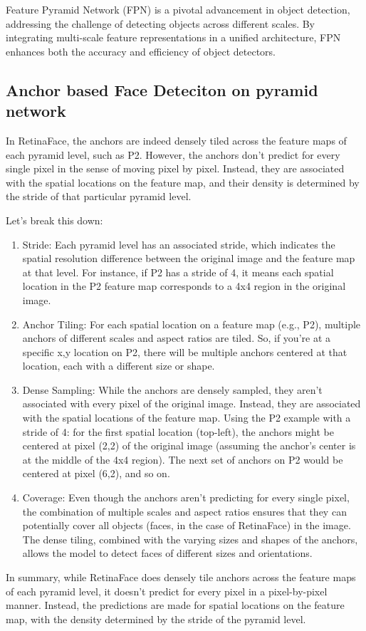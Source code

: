 \documentclass{article}
\begin{document}
Feature Pyramid Network (FPN) is a pivotal advancement in object detection, addressing the challenge of detecting objects across different scales. By integrating multi-scale feature representations in a unified architecture, FPN enhances both the accuracy and efficiency of object detectors.


\subsection{Anchor based Face Deteciton on pyramid network}

In RetinaFace, the anchors are indeed densely tiled across the feature maps of each pyramid level, such as P2. However, the anchors don't predict for every single pixel in the sense of moving pixel by pixel. Instead, they are associated with the spatial locations on the feature map, and their density is determined by the stride of that particular pyramid level.

Let's break this down:

\begin{enumerate}
  \item Stride: Each pyramid level has an associated stride, which indicates the spatial resolution difference between the original image and the feature map at that level. For instance, if P2 has a stride of 4, it means each spatial location in the P2 feature map corresponds to a 4x4 region in the original image.
  \item Anchor Tiling: For each spatial location on a feature map (e.g., P2), multiple anchors of different scales and aspect ratios are tiled. So, if you're at a specific x,y location on P2, there will be multiple anchors centered at that location, each with a different size or shape.
  \item Dense Sampling: While the anchors are densely sampled, they aren't associated with every pixel of the original image. Instead, they are associated with the spatial locations of the feature map. Using the P2 example with a stride of 4: for the first spatial location (top-left), the anchors might be centered at pixel (2,2) of the original image (assuming the anchor's center is at the middle of the 4x4 region). The next set of anchors on P2 would be centered at pixel (6,2), and so on.
  \item Coverage: Even though the anchors aren't predicting for every single pixel, the combination of multiple scales and aspect ratios ensures that they can potentially cover all objects (faces, in the case of RetinaFace) in the image. The dense tiling, combined with the varying sizes and shapes of the anchors, allows the model to detect faces of different sizes and orientations.
\end{enumerate}
In summary, while RetinaFace does densely tile anchors across the feature maps of each pyramid level, it doesn't predict for every pixel in a pixel-by-pixel manner. Instead, the predictions are made for spatial locations on the feature map, with the density determined by the stride of the pyramid level.
\end{document}

